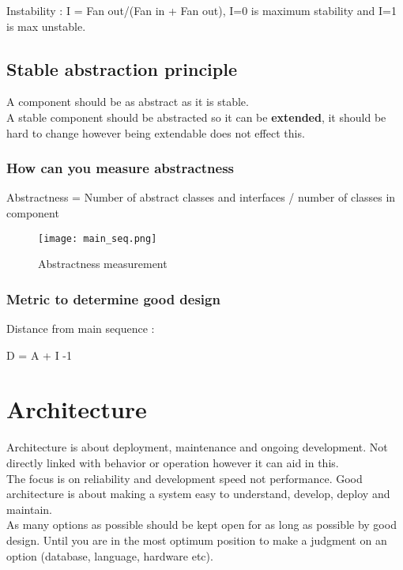 \documentclass[11pt]{scrartcl} %
\begin{document}
Instability : I = Fan out/(Fan in + Fan out), I=0 is maximum stability
and I=1 is max unstable.

\subsection{Stable abstraction principle}

A component should be as abstract as it is stable.\\

A stable component should be abstracted so it can be \textbf{extended},
it should be hard to change however being extendable does not effect
this.

\subsubsection{How can you measure abstractness}

Abstractness = Number of abstract classes and interfaces / number of
classes in component

\begin{figure}[h] %
	\centering
	\texttt{[image: main\_seq.png]} %
	\caption{Abstractness measurement}
\end{figure}

\subsubsection{Metric to determine good design}

Distance from main sequence :

D = \textbar{} A + I -1 \textbar{}

\section{Architecture}

Architecture is about deployment, maintenance and ongoing development.
Not directly linked with behavior or operation however it can aid in
this.\\

The focus is on reliability and development speed not performance. Good architecture is about
making a system easy to understand, develop, deploy and maintain.\\

As many options as possible should be kept open for as long as possible
by good design. Until you are in the most optimum position to make a
judgment on an option (database, language, hardware etc).\\
\end{document}
